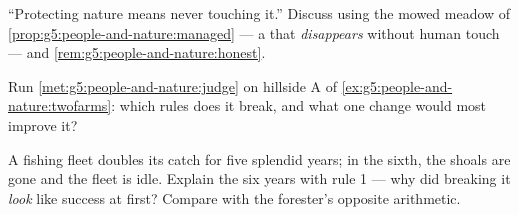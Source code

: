 \begin{exercise}[$\star\star$]\label{exo:g5:people-and-nature:9}
``Protecting nature means never touching it.'' Discuss using
the mowed meadow of
\cref{prop:g5:people-and-nature:managed} --- a  that
\emph{disappears} without human touch --- and
\cref{rem:g5:people-and-nature:honest}.
\end{exercise}

\begin{exercise}[$\star\star$]\label{exo:g5:people-and-nature:10}
Run \cref{met:g5:people-and-nature:judge} on hillside A of
\cref{ex:g5:people-and-nature:twofarms}: which rules does
it break, and what one change would most improve it?
\end{exercise}

\begin{exercise}[$\star\star\star$]\label{exo:g5:people-and-nature:11}
A fishing fleet doubles its catch for five splendid years;
in the sixth, the shoals are gone and the fleet is idle.
Explain the six years with rule 1 --- why did breaking it
\emph{look} like success at first? Compare with the
forester's opposite arithmetic.
\end{exercise}
